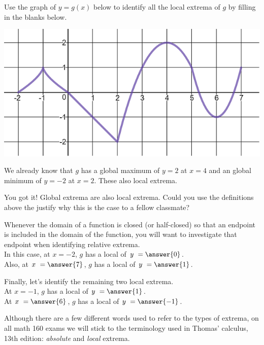\documentclass{ximera}
\begin{document}
\begin{exercise}
Use the graph of $y = g(x)$ below to identify all the local extrema of $g$ by filling in the blanks below. 

\begin{center} \includegraphics[scale=0.5]{extrema3new.png} \end{center}

We already know that $g$ has a global maximum of $y = 2$ at $x=4$ and an global minimum of $y=-2$ at $x=2$.  These  also local extrema.  

\begin{feedback}[correct]
You got it!  Global extrema are also local extrema.  Could you use the definitions above the justify why this is the case to a fellow classmate?  
\end{feedback}

\begin{exercise}
Whenever the domain of a function is closed (or half-closed) so that an endpoint is included in the domain of the function, you will want to investigate that endpoint when identifying relative extrema.  \\

In this case, at $x = -2$, $g$ has a local  of $y \ = \answer{0}$.  \\

Also, at $x \ =\answer{7}$, $g$ has a local  of $y \ = \answer{1}$.  \\

\begin{exercise}
Finally, let's identify the remaining two local extrema. \\

At $x = -1$, $g$ has a local  of $y \ = \answer{1}$.  \\

At $x \ = \answer{6}$, $g$ has a local  of $y \ = \answer{-1}$.  \\

\end{exercise}

\end{exercise}


\end{exercise}

\begin{warning}
Although there are a few different words used to refer to the types of extrema, on all math 160 exams we will stick to the terminology used in Thomas' calculus, 13th edition: \textit{absolute} and \textit{local} extrema.  
\end{warning}
\end{document}

